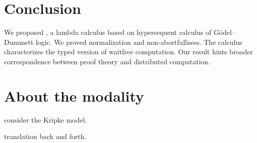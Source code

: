 \section{Conclusion}
\label{conc}
We proposed \lgd, a lambda calculus
based on hypersequent calculus of 
G\"odel--Dummett logic.
We proved normalization and non-abortfullness.
The calculus characterizes
the typed version of waitfree computation.
Our result 
hints broader correspondence between
proof theory and distributed computation.

\section{About the modality}

consider the Kripke model.

translation back and forth.
